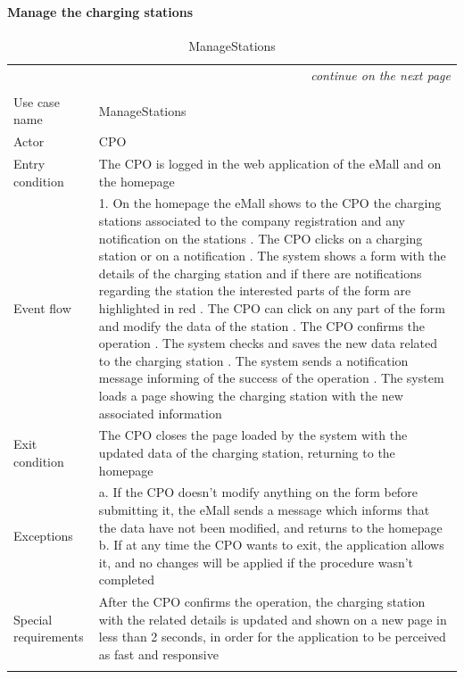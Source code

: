\paragraph{Manage the charging stations}
\begin{center}
    \begin{longtable}{p{4cm} p{11cm}}
    \multicolumn{2}{r}{\itshape{continue on the next page}}\\
    \endfoot 
    \\
    \endlastfoot
    \hline
     Use case name &  ManageStations\\
     \hline
     Actor & CPO \\
     \hline
     Entry condition & The CPO is logged in the web application of the eMall and on the homepage \\
     \hline
     Event flow &   
        1. On the homepage the eMall shows to the CPO the charging stations associated to the company registration and any notification on the stations \newline
        2. The CPO clicks on a charging station or on a notification \newline 
        3. The system shows a form with the details of the charging station and if there are notifications regarding the station the interested parts of the form are highlighted in red \newline
        4. The CPO can click on any part of the form and modify the data of the station \newline
        5. The CPO confirms the operation \newline
        6. The system checks and saves the new data related to the charging station \newline
        7. The system sends a notification message informing of the success of the operation \newline
        8. The system loads a page showing the charging station with the new associated information\\
     \hline
     Exit condition &  The CPO closes the page loaded by the system with the updated data of the charging station, returning to the homepage \\
     \hline
     Exceptions &   
        a. If the CPO doesn't modify anything on the form before submitting it, the eMall sends a message which informs that the data have not been modified, and returns to the homepage \newline
         b. If at any time the CPO wants to exit, the application allows it, and no changes will be applied if the procedure wasn't completed \\
     \hline
     Special requirements & After the CPO confirms the operation, the charging station with the related details is updated and shown on a new page in less than 2 seconds, in order for the application to be perceived as fast and responsive \\
     \hline
    \caption{ManageStations}
    \label{tab:ManageStations}
    \end{longtable}
\end{center}

